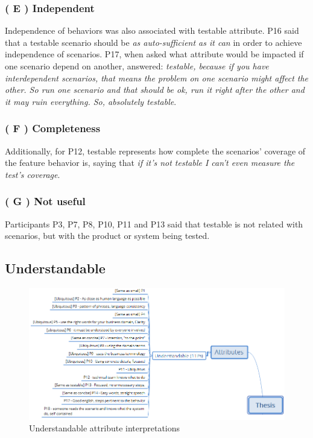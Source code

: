 \subsubsection{\textbf{( E ) Independent}}
Independence of behaviors was also associated with testable attribute. P16 said that a testable scenario should be \textit{as auto-sufficient as it can} in order to achieve independence of scenarios. P17, when asked what attribute would be impacted if one scenario depend on another, answered: \textit{testable, because if you have interdependent scenarios, that means the problem on one scenario might affect the other. So run one scenario and that should be ok, run it right after the other and it may ruin everything. So, absolutely testable}. 

\subsubsection{\textbf{( F ) Completeness}}
Additionally, for P12, testable represents how complete the scenarios' coverage of the feature behavior is, saying that \textit{if it's not testable I can't even measure the test's coverage}. 

\subsubsection{\textbf{( G ) Not useful}}
Participants P3, P7, P8, P10, P11 and P13 said that testable is not related with scenarios, but with the product or system being tested.

\subsection{Understandable}

\begin{figure}[t]
	\centering
	\includegraphics[scale=0.8]{images/understandable_attribute}
	\caption[\hspace{2mm}Understandable attribute interpretations]{Understandable attribute interpretations}
	\label{fig:understandable_attribute}
\end{figure}

